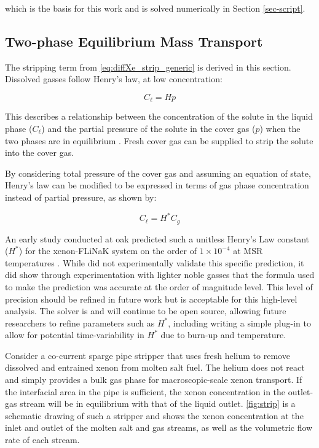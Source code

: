 which is the basis for this work and is solved numerically in Section \ref{sec-script}. 

\subsection{Two-phase Equilibrium Mass Transport}\label{sec-masstransport}
The stripping term from \ref{eq:diffXe_strip_generic} is derived in this section. Dissolved gasses follow Henry's law, at low concentration: 

\begin{equation}\label{eq:henry}
    C_{\ell} = Hp
\end{equation}

 This describes a relationship between the concentration of the solute in the liquid phase ($C_{\ell}$) and the partial pressure of the solute in the cover gas ($p$) when the two phases are in equilibrium \cite[Ch. 10]{Geankoplis}. Fresh cover gas can be supplied to strip the solute into the cover gas.

By considering total pressure of the cover gas and assuming an equation of state, Henry's law can be modified to be expressed in terms of gas phase concentration instead of partial pressure, as shown by: 

\begin{equation}\label{eq:henry-modified}
    C_{\ell} = H^{*}C_g
\end{equation}

An early study conducted at \acs{oak} predicted such a unitless Henry's Law constant ($H^*$) for the xenon-FLiNaK system on the order of $1 \times 10^{-4}$ at MSR temperatures \cite{ORNL-solubility}. While \cite{ORNL-solubility} did not experimentally validate this specific prediction, it did show through experimentation with lighter noble gasses that the formula used to make the prediction was accurate at the order of magnitude level. This level of precision should be refined in future work but is acceptable for this high-level analysis. The solver is and will continue to be open source, allowing future researchers to refine  parameters such as $H^*$, including writing a simple plug-in to allow for potential time-variability in $H^*$ due to burn-up and temperature.

Consider a co-current sparge pipe stripper that uses fresh helium to remove dissolved and entrained xenon from molten salt fuel. The helium does not react and simply provides a bulk gas phase for macroscopic-scale xenon transport. If the interfacial area in the pipe is sufficient, the xenon concentration in the outlet-gas stream will be in equilibrium with that of the liquid outlet. \cref{fig:strip} is a schematic drawing of such a stripper and shows the xenon concentration at the inlet and outlet of the molten salt and gas streams, as well as the volumetric flow rate of each stream. 

